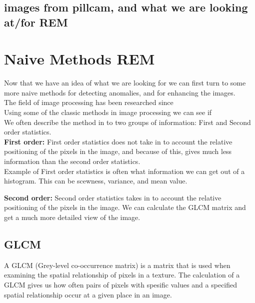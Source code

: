\documentclass[a4paper,english]{ifimaster}
\begin{document}
	  \subsection{images from pillcam, and what we are looking at/for REM}
	  
	
	\section{Naive Methods REM}
	  Now that we have an idea of what we are looking for we can first turn to some more naive methods for detecting anomalies, and for enhancing the images.\\
	  The field of image processing has been researched since\\ %
	  
	  Using some of the classic methods in image processing we can see if\\ %
	  
	  We often describe the method in to two groups of information: First and Second order statistics.\\
	  \textbf{First order:} First order statistics does not take in to account the relative positioning of the pixels in the image, and because of this, gives much less
	  information than the second order statistics.\\
	  Example of First order statistics is often what information we can get out of a histogram. This can be scewness, variance, and mean value.\\
	  
	  \vspace{10px}
	  
	  \textbf{Second order:} Second order statistics takes in to account the relative positioning of the pixels in the image. We can calculate the GLCM matrix and get a much more detailed 
	  view of the image. \\
	  
	  
	  
	  \subsection{GLCM}
	    A GLCM (Grey-level co-occurrence matrix) is a matrix that is used when examining the spatial relationship of pixels in a texture. 
	    The calculation of a GLCM gives us how often pairs of pixels with spesific values and a specified spatial relationship occur at a given place in an image. %
	  
\end{document}
